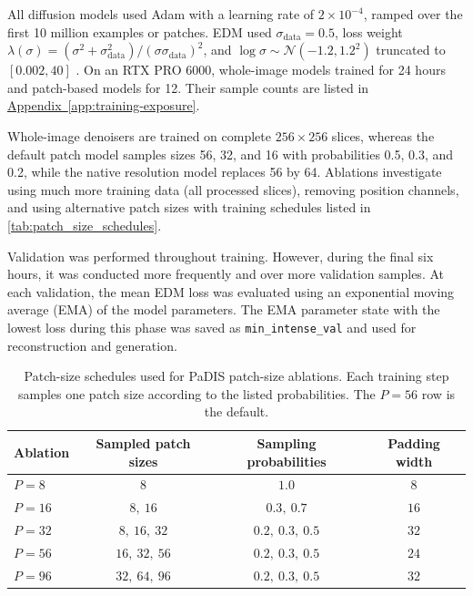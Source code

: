 All diffusion models used Adam \cite{kingma_adam_2017-1} with a learning rate of $2\times10^{-4}$, ramped over the first 10 million examples or patches. EDM used $\sigma_{\mathrm{data}}=0.5$, loss weight $\lambda(\sigma)=(\sigma^2+\sigma_{\mathrm{data}}^2)/(\sigma\sigma_{\mathrm{data}})^2$, and $\log\sigma\sim\mathcal{N}(-1.2,1.2^2)$ truncated to $[0.002,40]$ \cite{karras_elucidating_2022-1}. On an RTX PRO 6000, whole-image models trained for 24 hours and patch-based models for 12. Their sample counts are listed in \hyperref[app:training-exposure]{Appendix~\ref*{app:training-exposure}}.

Whole-image denoisers are trained on complete $256\times256$ slices, whereas the default patch model samples sizes 56, 32, and 16 with probabilities 0.5, 0.3, and 0.2, while the native resolution model replaces 56 by 64. Ablations investigate using much more training data (all processed slices), removing position channels, and using alternative patch sizes with training schedules listed in \autoref{tab:patch_size_schedules}.

Validation was performed throughout training. However, during the final six hours, it was conducted more frequently and over more validation samples. At each validation, the mean EDM loss was evaluated using an exponential moving average (EMA) of the model parameters. The EMA parameter state with the lowest loss during this phase was saved as \texttt{min\_intense\_val} and used for reconstruction and generation.

\begin{table}[ht] 
    \centering 
    \begin{tabular}{lccc} 
        \hline 
        \textbf{Ablation} & \textbf{Sampled patch sizes} & \textbf{Sampling probabilities} & \textbf{Padding width} \\ 
        \hline 
        $P=8$ & $8$ & $1.0$ & $8$ \\ 
        $P=16$ & $8,\ 16$ & $0.3,\ 0.7$ & $16$ \\ 
        $P=32$ & $8,\ 16,\ 32$ & $0.2,\ 0.3,\ 0.5$ & $32$ \\ 
        $P=56$ & $16,\ 32,\ 56$ & $0.2,\ 0.3,\ 0.5$ & $24$ \\ 
        $P=96$ & $32,\ 64,\ 96$ & $0.2,\ 0.3,\ 0.5$ & $32$ \\ 
        \hline 
    \end{tabular} 
    \caption[PaDIS patch-size training schedules.]{Patch-size schedules used for PaDIS patch-size ablations. Each training step samples one patch size according to the listed probabilities. The $P=56$ row is the default.}
    \label{tab:patch_size_schedules}
\end{table}

